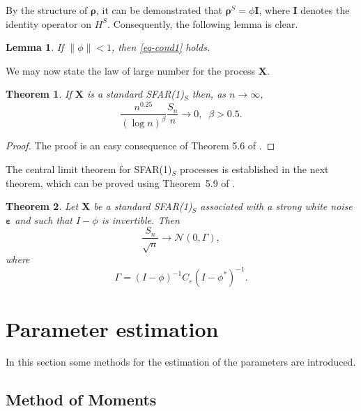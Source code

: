 \documentclass[11pt,a4paper]{article}
\newtheorem{lemma} {Lemma}[section]
\newtheorem{Theorem} {Theorem}[section]
\numberwithin{equation}{section}
\begin{document}
By the structure of $\bm{\rho}$, it can be demonstrated that $\bm{\rho}^S=\phi\bm{I}$, where $\bm{I}$ denotes the identity operator on $H^S$. Consequently, the following lemma is clear.

\begin{lemma}
  {If $\left\|\phi\right\|<1$, then \eqref{eq-cond1} holds.}
\end{lemma}

We may now state the law of large number for the process $\bm{X}.$

\begin{Theorem}
  If $\bm{X}$ is a standard SFAR(1)$_S$ then, as $n\rightarrow\infty$,
  \begin{equation}
    \frac{n^{0.25}}{(\log{n})^{\beta}}{\frac{S_{n}}{n}}\rightarrow 0,\;\;\beta>0.5.
  \end{equation}
\end{Theorem}

\begin{proof}
  The proof is an easy consequence of Theorem 5.6 of \citet{Bosq2000}.
\end{proof}

The central limit theorem for SFAR(1)$_S$ processes is established in the next theorem, which can be proved using Theorem~5.9 of \citet{Bosq2000}.
\begin{Theorem}
  Let $\bm{X}$ be a standard SFAR(1)$_S$ associated with a strong white noise $\bm{\varepsilon}$ and such that $I-\phi$ is invertible. Then
  \begin{equation}
    \frac{S_{n}}{\sqrt{n}}\rightarrow\mathcal{N}(0,\Gamma),
  \end{equation}
  where
  \begin{equation}
    \Gamma=(I-\phi)^{-1}C_{\varepsilon}(I-\phi^{*})^{-1}.
  \end{equation}
\end{Theorem}


\section{Parameter estimation}\label{sec:estimation}

In this section some methods for the estimation of the parameters are introduced.

\subsection{Method of Moments}
\end{document}
